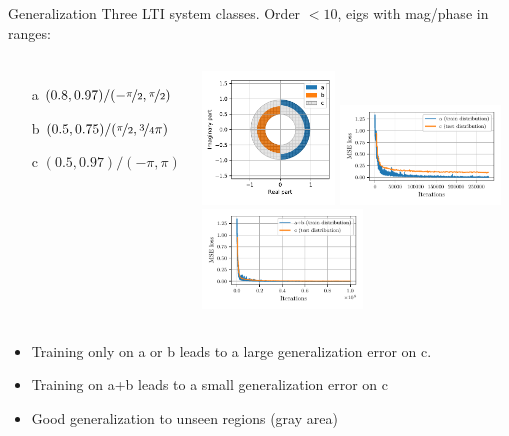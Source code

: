 \documentclass{beamer}
\begin{document}
\begin{frame}{Generalization}
Three LTI system classes. Order $< 10$, eigs with mag/phase in ranges:
\begin{columns}
\begin{itemize}
     \item[a] $(0.8, 0.97) / (-\nicefrac{\pi}{2}, \nicefrac{\pi}{2})$
     \item[b] $(0.5, 0.75) / (\nicefrac{\pi}{2}, \nicefrac{3}{4}\pi)$
     \item[c] $(0.5, 0.97) / (-\pi, \pi)$  
\end{itemize}
\includegraphics[height=100pt]{fig/shift/pole_distribution.pdf}
\includegraphics[height=75pt]{fig/shift/loss_shift_A.pdf}\\
\includegraphics[height=75pt]{fig/shift/loss_shift_AB.pdf}
\end{columns}
\pause
\begin{itemize}
     \item Training only on a or b leads to a large generalization error on c.
     \item Training on a+b leads to a small generalization error on c
     \item Good generalization to unseen regions (gray area)
\end{itemize}

\end{frame}
\end{document}
